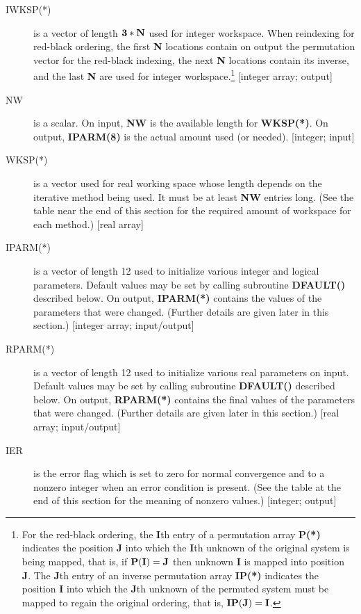 \begin{description}
 \item[IWKSP(*)] is a vector of length ${\bf 3*N}$ used for integer workspace. 
                 When reindexing for red-black ordering, the first 
                 {\bf N} locations contain on output the permutation 
                 vector for the red-black indexing, the next {\bf N} 
                 locations contain its inverse, and the last {\bf N} 
                 are used for integer workspace.\footnote{For the 
                 red-black ordering, the {\bf I}th entry of a permutation 
                 array {\bf P(*)} indicates the position {\bf J} into 
                 which the {\bf I}th unknown of the original system is 
                 being mapped, that is, if ${\bf P(I)=J}$ then unknown 
                 {\bf I} is mapped into position {\bf J}.  The {\bf J}th 
                 entry of an inverse permutation array {\bf IP(*)} 
                 indicates the position {\bf I} into which the {\bf J}th 
                 unknown of the permuted system must be mapped to regain 
                 the original ordering, that is, ${\bf IP(J)=I}$.} 
                 [integer array; output] 

 \item[NW] is a scalar.  On input, {\bf NW} is the available length for 
           {\bf WKSP(*)}.  On output, {\bf IPARM(8)} is the actual 
           amount used (or needed).  [integer; input] 

 \item[WKSP(*)] is a vector used for real working space whose length depends 
                on the iterative method being used.  It must be at least 
                {\bf NW} entries long.  (See the table near the end of this 
                section for the required amount of workspace for each 
                method.) [real array] 

 \item[IPARM(*)] is a vector of length 12 used to initialize various 
                 integer and logical parameters.  Default values may be 
                 set by calling subroutine {\bf DFAULT()} described below.
                 On output, {\bf IPARM(*)} contains the values of the 
                 parameters that were changed.  (Further details are 
                 given later in this section.)  [integer array; 
                 input/output] 

 \item[RPARM(*)] is a vector of length 12 used to initialize various real 
                 parameters on input.  Default values may be set by 
                 calling subroutine {\bf DFAULT()} described below.  On 
                 output, {\bf RPARM(*)} contains the final values of 
                 the parameters that were changed.  (Further details 
                 are given later in this section.)  [real array; 
                 input/output] 

 \item[IER] is the error flag which is set to zero for normal convergence 
            and to a nonzero integer when an error condition is 
            present.  (See the table at the end of this section 
            for the meaning of nonzero values.)  [integer; output] 

\end{description}
